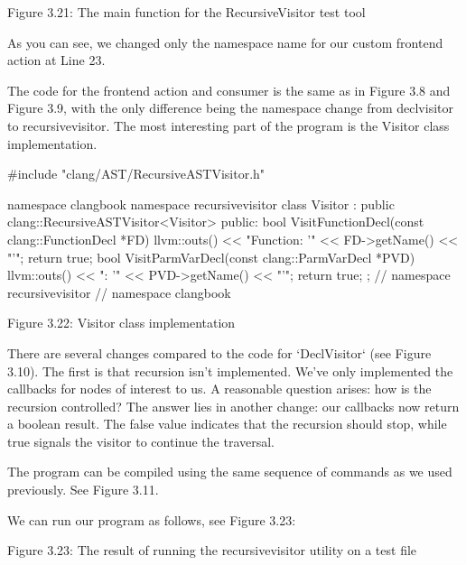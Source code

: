 \begin{center}
Figure 3.21: The main function for the RecursiveVisitor test tool
\end{center}

As you can see, we changed only the namespace name for our custom frontend action at Line 23.

The code for the frontend action and consumer is the same as in Figure 3.8 and Figure 3.9, with the only difference being the namespace change from declvisitor to recursivevisitor. The most interesting part of the program is the Visitor class implementation.

\begin{cpp}
#include "clang/AST/RecursiveASTVisitor.h"

namespace clangbook {
namespace recursivevisitor {
class Visitor : public clang::RecursiveASTVisitor<Visitor> {
public:
  bool VisitFunctionDecl(const clang::FunctionDecl *FD) {
    llvm::outs() << "Function: '" << FD->getName() << "'\n";
    return true;
  }
  bool VisitParmVarDecl(const clang::ParmVarDecl *PVD) {
    llvm::outs() << "\tParameter: '" << PVD->getName() << "'\n";
    return true;
  }
};
} // namespace recursivevisitor
} // namespace clangbook
\end{cpp}

\begin{center}
Figure 3.22: Visitor class implementation
\end{center}

There are several changes compared to the code for ‘DeclVisitor‘ (see Figure 3.10). The first is that recursion isn't implemented. We've only implemented the callbacks for nodes of interest to us. A reasonable question arises: how is the recursion controlled? The answer lies in another change: our callbacks now return a boolean result. The false value indicates that the recursion should stop, while true signals the visitor to continue the traversal.

The program can be compiled using the same sequence of commands as we used previously. See Figure 3.11.

We can run our program as follows, see Figure 3.23:


\begin{center}
Figure 3.23: The result of running the recursivevisitor utility on a test file
\end{center}

